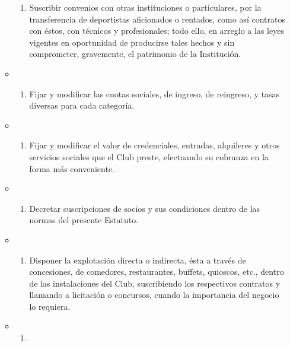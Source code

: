 \documentclass[]{book}
\providecommand{\tightlist}{%
  \setlength{\itemsep}{0pt}\setlength{\parskip}{0pt}}
\begin{document}
\begin{itemize}
\begin{itemize}
\begin{enumerate}
    \tightlist
    \item
      Suscribir convenios con otras instituciones o particulares, por la
      transferencia de deportistas aficionados o rentados, como así
      contratos con éstos, con técnicos y profesionales; todo ello, en
      arreglo a las leyes vigentes en oportunidad de producirse tales
      hechos y sin comprometer, gravemente, el patrimonio de la
      Institución.
    \end{enumerate}
  \item
    \begin{enumerate}
    \def\labelenumi{\alph{enumi})}
    \setcounter{enumi}{12}
    \tightlist
    \item
      Fijar y modificar las cuotas sociales, de ingreso, de reingreso, y
      tasas diversas para cada categoría.
    \end{enumerate}
  \item
    \begin{enumerate}
    \def\labelenumi{\alph{enumi})}
    \setcounter{enumi}{13}
    \tightlist
    \item
      Fijar y modificar el valor de credenciales, entradas, alquileres y
      otros servicios sociales que el Club preste, efectuando su
      cobranza en la forma más conveniente.
    \end{enumerate}
  \item
    \begin{enumerate}
    \def\labelenumi{\alph{enumi})}
    \setcounter{enumi}{14}
    \tightlist
    \item
      Decretar suscripciones de socios y sus condiciones dentro de las
      normas del presente Estatuto.
    \end{enumerate}
  \item
    \begin{enumerate}
    \def\labelenumi{\alph{enumi})}
    \setcounter{enumi}{15}
    \tightlist
    \item
      Disponer la explotación directa o indirecta, ésta a través de
      concesiones, de comedores, restaurantes, buffets, quioscos, etc.,
      dentro de las instalaciones del Club, suscribiendo los respectivos
      contratos y llamando a licitación o concursos, cuando la
      importancia del negocio lo requiera.
    \end{enumerate}
  \item
    \begin{enumerate}
    \def\labelenumi{\alph{enumi})}
    \setcounter{enumi}{16}
    \tightlist
    \item

\end{enumerate}
\end{itemize}
\end{itemize}
\end{document}

